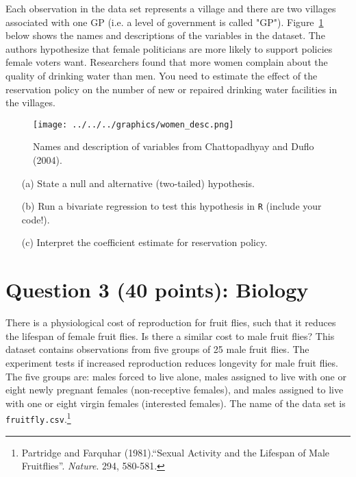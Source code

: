 \documentclass[12pt,letterpaper]{article}
\begin{document}
\noindent Each observation in the data set represents a village and there are two villages associated with one GP (i.e. a level of government is called "GP"). Figure~\ref{fig:women_desc} below shows the names and descriptions of the variables in the dataset. The authors hypothesize that female politicians are more likely to support policies female voters want. Researchers found that more women complain about the quality of drinking water than men. You need to estimate the effect of the reservation policy on the number of new or repaired drinking water facilities in the villages.
\vspace{.5cm}
\begin{figure}[h!]
	\caption{\footnotesize{Names and description of variables from Chattopadhyay and Duflo (2004).}}
	\vspace{.5cm}
	\centering
	\label{fig:women_desc}
	\texttt{[image: ../../../graphics/women\_desc.png]}
\end{figure}		

\newpage
\begin{enumerate}
	\item [(a)] State a null and alternative (two-tailed) hypothesis. 
	
	\vspace{6cm}
	\item [(b)] Run a bivariate regression to test this hypothesis in \texttt{R} (include your code!).
	
	\vspace{6cm}
	\item [(c)] Interpret the coefficient estimate for reservation policy. 
\end{enumerate}

\newpage
	\section*{Question 3 (40 points): Biology}

There is a physiological cost of reproduction for fruit flies, such that it reduces the lifespan of female fruit flies.  Is there a similar cost to male fruit flies?  This dataset contains observations from five groups of 25 male fruit flies. The experiment tests if increased reproduction reduces longevity for male fruit flies. The five groups are: males forced to live alone, males assigned to live with one or eight newly pregnant females (non-receptive females), and males assigned to live with one or eight virgin females (interested females). The name of the data set is \texttt{fruitfly.csv}.\footnote{Partridge and Farquhar (1981).``Sexual Activity and the Lifespan of Male Fruitflies''. \textit{Nature}. 294, 580-581.}
	\vspace{1cm}
\end{document}
